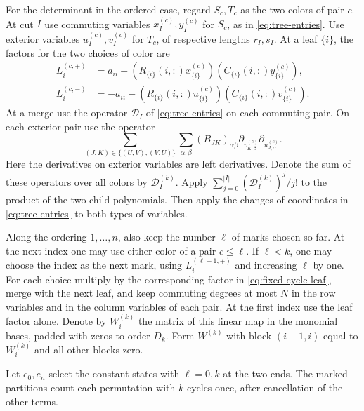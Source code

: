 \documentclass[11pt,reqno]{amsart}
\theoremstyle{remark}
\numberwithin{equation}{section}
\begin{document}
For the determinant in the ordered case, regard \(S_c,T_c\) as
the two colors of pair \(c\). At cut \(I\) use commuting variables
\(x_I^{(c)},y_I^{(c)}\) for \(S_c\), as in \eqref{eq:tree-entries}.
Use exterior variables \(u_I^{(c)},v_I^{(c)}\) for \(T_c\),
of respective lengths \(r_I,s_I\). At a leaf \(\{i\}\), the factors for the two
choices of color are
\begin{equation}\label{eq:fixed-cycle-leaf}
 \begin{split}
 L_i^{(c,+)}&=a_{ii}+
   (R_{\{i\}}(i,:)x_{\{i\}}^{(c)})(C_{\{i\}}(i,:)y_{\{i\}}^{(c)}),\\
 L_i^{(c,-)}&=-a_{ii}-
   (R_{\{i\}}(i,:)u_{\{i\}}^{(c)})(C_{\{i\}}(i,:)v_{\{i\}}^{(c)}).
 \end{split}
\end{equation}
At a merge use the operator \(\mathcal D_I\) of
\eqref{eq:tree-entries} on each commuting pair. On each exterior
pair use the operator
\begin{equation}\label{eq:fixed-cycle-exterior}
 \sum_{(J,K)\in\{(U,V),(V,U)\}}
     \sum_{\alpha,\beta}(B_{JK})_{\alpha\beta}
       \partial_{v_{K,\beta}^{(c)}}\partial_{u_{J,\alpha}^{(c)}} .
\end{equation}
Here the derivatives on exterior variables are left derivatives. Denote the sum of
these operators over all colors by \(\mathcal D_I^{(k)}\).
Apply \(\sum_{j=0}^{|I|}(\mathcal D_I^{(k)})^j/j!\) to the
product of the two child polynomials. Then apply the changes of
coordinates in \eqref{eq:tree-entries} to both types of variables.

Along the ordering \(1,\ldots,n\), also keep the number \(\ell\)
of marks chosen so far. At the next index one may use either
color of a pair \(c\leq\ell\). If \(\ell<k\), one may choose
the index as the next mark, using \(L_i^{(\ell+1,+)}\) and
increasing \(\ell\) by one. For each choice multiply by the
corresponding factor in \eqref{eq:fixed-cycle-leaf}, merge
with the next leaf, and keep commuting degrees at most \(N\)
in the row variables and in the column variables of each
pair. At the first index use the leaf factor alone. Denote by
\(W_i^{(k)}\) the matrix of this linear map in the monomial
bases, padded with zeros to order \(D_k\). Form \(W^{(k)}\)
with block \((i-1,i)\) equal to \(W_i^{(k)}\) and all other
blocks zero.

Let \(e_0,e_n\) select the constant states with \(\ell=0,k\)
at the two ends. The marked partitions count each permutation
with \(k\) cycles once, after cancellation of the other terms.
\end{document}
